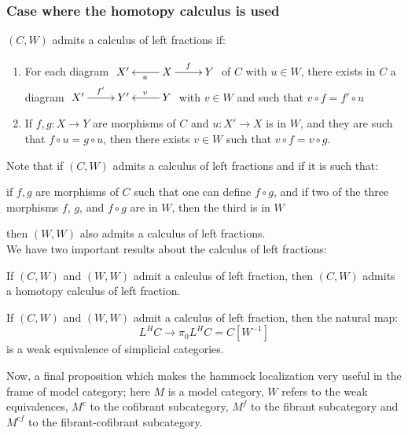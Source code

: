 \subsubsection{Case where the homotopy calculus is used}

\begin{defin}
$(C,W)$ admits a calculus of left fractions if:
\begin{enumerate}
\item For each diagram $\xymatrix{{X'} & X \ar[l]^u \ar[r]^f & Y}$ of $C$ with $u \in W$, there exists in $C$ a diagram $\xymatrix{{X'} \ar[r]^{f'} & {Y'}  & Y \ar[l]_v}$ with $v \in W$ and such that $v \circ f = f' \circ u$
\item If $f,g : X \rightarrow Y$ are morphisms of $C$ and $u :X' \rightarrow X$ is in $W$, and they are such that $f \circ u = g \circ u$, then there exists $v \in W$ such that $v \circ f= v \circ g$.
\end{enumerate} 
\end{defin}

Note that if $(C,W)$ admits a calculus of left fractions and if it is such that:
\begin{center}
if $f,g$ are morphisms of $C$ such that one can define $f \circ g$, and if two of the three morphisms $f$, $g$, and $f \circ g$ are in $W$, then the third is in $W$ 
\end{center}
then $(W,W)$ also admits a calculus of left fractions.\\


We have two important results about the calculus of left fractions:

\begin{prop}
If $(C,W)$ and $(W,W)$ admit a calculus of left fraction, then $(C,W)$ admits a homotopy calculus of left fraction.
\end{prop}

\begin{prop}
If $(C,W)$ and $(W,W)$ admit a calculus of left fraction, then the natural map:
\begin{equation}
L^H C \rightarrow \pi_0 L^H C = C[W^{-1}]
\end{equation}
is a weak equivalence of simplicial categories.
\end{prop}

Now, a final proposition which makes the hammock localization very useful in the frame of model category; here $M$ is a model category, $W$ refers to the weak equivalences, $M^c$ to the cofibrant subcategory, $M^f$ to the fibrant subcategory and $M^{cf}$ to the fibrant-cofibrant subcategory.


